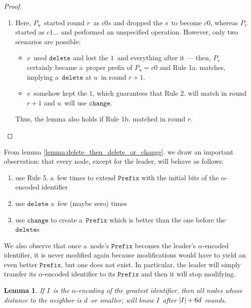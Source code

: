 \documentclass{article}
\newtheorem{lemma}{Lemma}
\DeclarePairedDelimiter{\lendelimiter}{|}{|}
\def\len{\lendelimiter*}
\begin{document}
\begin{proof}
\begin{enumerate}[label={\arabic*.}]
\begin{enumerate}[label={(\alph*)}]
                Therefore, if Rule 1a. was exercised in round \(r\), the lemma indeed holds.
            \item Here, \(P_u\)~started round \(r\)~as \(c0s\) and dropped the \(s\)~to become \(c0\), whereas \(P_v\) started as \(c1\ldots\) and performed an unspecified operation. However, only two scenarios are possible:
                \begin{itemize}
                    \item \(v\)~used \(\texttt{delete}\) and lost the \(1\)~and everything after it --- then, \(P_v\) certainly became a~proper prefix of \(P_u = c0\) and Rule 1a. matches, implying a~\(\texttt{delete}\) at \(u\)~in round \(r + 1\).
                    \item \(v\)~somehow kept the \(1\), which guarantees that Rule 2. will match in round \(r + 1\) and \(u\)~will use \(\texttt{change}\).
                \end{itemize}
                Thus, the lemma also holds if Rule 1b. matched in round \(r\).
        \end{enumerate}
\end{enumerate}
\end{proof}
From lemma \ref{lemma:delete_then_delete_or_change}. we draw an important observation: that every node, except for the leader, will behave as follows:
\begin{enumerate}[label=(\roman*)]
    \item use Rule 5. a~few times to extend \(\texttt{Prefix}\) with the initial bits of the \(\alpha\)-encoded identifier
    \item use \(\texttt{delete}\) a~few (maybe zero) times
    \item use \(\texttt{change}\) to create a~\(\texttt{Prefix}\) which is better than the one before the \(\texttt{delete}\)s
\end{enumerate}
We also observe that once a~node's \(\texttt{Prefix}\) becomes the leader's \(\alpha\)-encoded identifier, it is never modified again because modifications would have to yield an even better \(\texttt{Prefix}\), but one does not exist. In particular, the leader will simply transfer its \(\alpha\)-encoded identifier to its \(\texttt{Prefix}\) and then it will stop modifying.
\begin{lemma}
\label{lemma:id_spreading}
If \(I\)~is the \(\alpha\)-encoding of the greatest identifier, then all nodes whose distance to the neighbor is \(d\)~or smaller, will know \(I\)~after \(\len{I} + 6d\) rounds.
\end{lemma}
\end{document}
